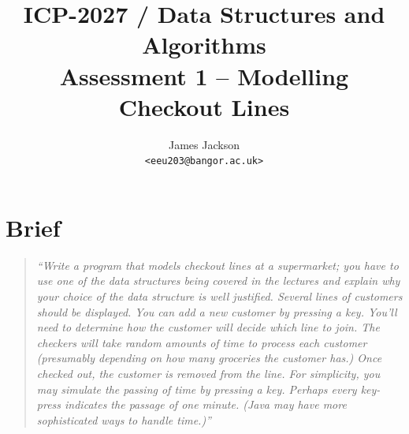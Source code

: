 \documentclass[pdftex,a4paper,10pt,titlepage]{article}
\begin{document}
\title{\textbf{ICP-2027 / Data Structures and Algorithms} \\ Assessment 1 – Modelling Checkout Lines}
\author{
James Jackson \\ \texttt{<eeu203@bangor.ac.uk>}
}
\maketitle




\pagebreak




\pagestyle{fancy}
\fancyhf{}
\cfoot{\thepage}

\tableofcontents
















\pagebreak
\section {Brief}

\begin{quote}
\textit{``Write a program that models checkout lines at a supermarket; you have to use one of the data 
structures being covered in the lectures and explain why your choice of the data structure is well 
justified. Several lines of customers should be displayed. You can add a new customer by pressing a 
key. You’ll need to determine how the customer will decide which line to join. The checkers will 
take random amounts of time to process each customer (presumably depending on how many 
groceries the customer has.) Once checked out, the customer is removed from the line. For 
simplicity, you may simulate the passing of time by pressing a key. Perhaps every key-press 
indicates the passage of one minute. (Java may have more sophisticated ways to handle time.)''
}
\end{quote}
\end{document}
